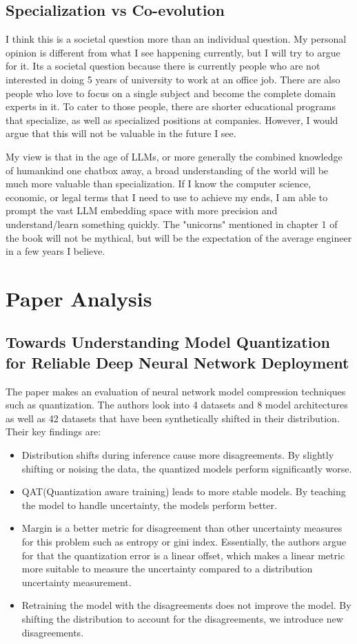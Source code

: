 \documentclass[a4paper, 11pt]{article} %
\begin{document}
\subsection{Specialization vs Co-evolution}
I think this is a societal question more than an individual question. My personal opinion is different from what I see happening currently, but I will try to argue for it.
Its a societal question because there is currently people who are not interested in doing 5 years of university to work at an office job.
There are also people who love to focus on a single subject and become the complete domain experts in it. 
To cater to those people, there are shorter educational programs that specialize, as well as specialized positions at companies. 
However, I would argue that this will not be valuable in the future I see.

My view is that in the age of LLMs, or more generally the combined knowledge of humankind one chatbox away, a broad understanding of the world will be much more valuable 
than specialization. If I know the computer science, economic, or legal terms that I need to use to achieve my ends, I am able to prompt the vast LLM embedding space with more precision and understand/learn something quickly.
The "unicorns" mentioned in chapter 1 of the book will not be mythical, but will be the expectation of the average engineer in a few years I believe.

\section{Paper Analysis}

\subsection{Towards Understanding Model Quantization for Reliable Deep Neural Network Deployment}
The paper\cite{quant_paper} makes an evaluation of neural network model compression techniques such as quantization. The authors look into 4 datasets and 8 model architectures as well 
as 42 datasets that have been synthetically shifted in their distribution. Their key findings are:
\begin{itemize}
  \item Distribution shifts during inference cause more disagreements. By slightly shifting or noising the data, the quantized models perform significantly worse. 
  \item QAT(Quantization aware training) leads to more stable models. By teaching the model to handle uncertainty, the models perform better. 
  \item Margin is a better metric for disagreement than other uncertainty measures for this problem such as entropy or gini index. Essentially, the authors argue for that the quantization error is a linear offset, which makes a linear metric more suitable to measure the uncertainty compared to a distribution uncertainty measurement.
  \item Retraining the model with the disagreements does not improve the model. By shifting the distribution to account for the disagreements, we introduce new disagreements.
\end{itemize}
\end{document}
